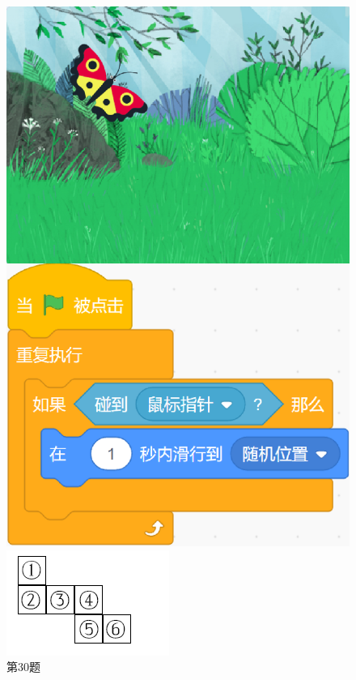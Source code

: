 \documentclass[10pt, a4paper]{article}
\begin{document}
\begin{enumerate}
        \begin{figure}[htbp]
            \centering
            \begin{minipage}[t]{.16\textwidth}
                \centering
                \includegraphics[width=\textwidth]{30.png}
                \caption*{第30题}
            \end{minipage}
            \begin{minipage}[t]{.18\textwidth}
                \centering
                \includegraphics[width=\textwidth]{31.png}

\end{minipage}
\end{figure}
\end{enumerate}
\end{document}
